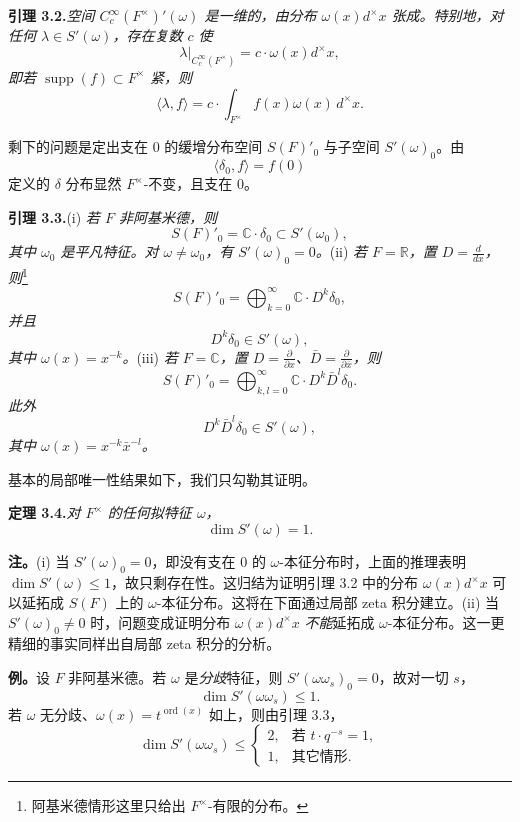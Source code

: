 \medskip\noindent\textbf{引理 3.2.}\quad \emph{空间 $C_c^\infty(F^\times)'(\omega)$ 是一维的，由分布 $\omega(x)d^\times x$ 张成。特别地，对任何 $\lambda\in S'(\omega)$，存在复数 $c$ 使}
\[
\lambda\big|_{C_c^\infty(F^\times)}=c\cdot\omega(x)d^\times x,
\]
\emph{即若 $\operatorname{supp}(f)\subset F^\times$ 紧，则}
\[
\langle\lambda,f\rangle=c\cdot\int_{F^\times}f(x)\omega(x)\,d^\times x.
\]

剩下的问题是定出支在 $0$ 的缓增分布空间 $S(F)'_0$ 与子空间 $S'(\omega)_0$。由
\[
\langle\delta_0,f\rangle=f(0)
\]
定义的 $\delta$ 分布显然 $F^\times$-不变，且支在 $0$。

\medskip\noindent\textbf{引理 3.3.}\quad (i) \emph{若 $F$ 非阿基米德，则}
\[
S(F)'_0=\mathbb C\cdot\delta_0\subset S'(\omega_0),
\]
\emph{其中 $\omega_0$ 是平凡特征。对 $\omega\ne\omega_0$，有 $S'(\omega)_0=0$。}(ii) \emph{若 $F=\mathbb R$，置 $D=\frac{d}{dx}$，则}\footnote{阿基米德情形这里只给出 $F^\times$-有限的分布。}
\[
S(F)'_0=\bigoplus_{k=0}^{\infty}\mathbb C\cdot D^k\delta_0,
\]
\emph{并且}
\[
D^k\delta_0\in S'(\omega),
\]
\emph{其中 $\omega(x)=x^{-k}$。}(iii) \emph{若 $F=\mathbb C$，置 $D=\frac{\partial}{\partial x}$、$\bar D=\frac{\partial}{\partial\bar x}$，则}
\[
S(F)'_0=\bigoplus_{k,l=0}^{\infty}\mathbb C\cdot D^k\bar D^l\delta_0.
\]
\emph{此外}
\[
D^k\bar D^l\delta_0\in S'(\omega),
\]
\emph{其中 $\omega(x)=x^{-k}\bar x^{-l}$。}

基本的局部唯一性结果如下，我们只勾勒其证明。

\medskip\noindent\textbf{定理 3.4.}\quad \emph{对 $F^\times$ 的任何拟特征 $\omega$，}
\[
\dim S'(\omega)=1.
\]

\medskip\noindent\textbf{注。}\quad (i) 当 $S'(\omega)_0=0$，即没有支在 $0$ 的 $\omega$-本征分布时，上面的推理表明 $\dim S'(\omega)\le1$，故只剩存在性。这归结为证明引理 3.2 中的分布 $\omega(x)d^\times x$ 可以延拓成 $S(F)$ 上的 $\omega$-本征分布。这将在下面通过局部 zeta 积分建立。(ii) 当 $S'(\omega)_0\ne0$ 时，问题变成证明分布 $\omega(x)d^\times x$ \emph{不能}延拓成 $\omega$-本征分布。这一更精细的事实同样出自局部 zeta 积分的分析。

\medskip\noindent\textbf{例。}\quad 设 $F$ 非阿基米德。若 $\omega$ 是\emph{分歧}特征，则 $S'(\omega\omega_s)_0=0$，故对一切 $s$，
\[
\dim S'(\omega\omega_s)\le1.
\]
若 $\omega$ 无分歧、$\omega(x)=t^{\operatorname{ord}(x)}$ 如上，则由引理 3.3，
\[
\dim S'(\omega\omega_s)\le
\begin{cases}
2,&\text{若 }t\cdot q^{-s}=1,\\
1,&\text{其它情形}.
\end{cases}
\]

